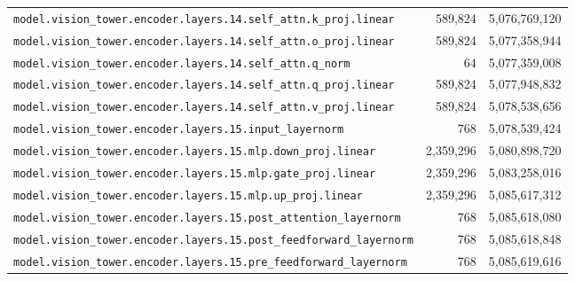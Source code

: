 \documentclass[10pt,a4paper]{article}
\theoremstyle{definition}
\begin{document}
\begin{appendices}
\begin{longtable}{p{9.5cm}rr}
\texttt{model.\allowbreak{}vision\_tower.\allowbreak{}encoder.\allowbreak{}layers.\allowbreak{}14.\allowbreak{}self\_attn.\allowbreak{}k\_proj.\allowbreak{}linear} & 589,824 & 5,076,769,120 \\
\texttt{model.\allowbreak{}vision\_tower.\allowbreak{}encoder.\allowbreak{}layers.\allowbreak{}14.\allowbreak{}self\_attn.\allowbreak{}o\_proj.\allowbreak{}linear} & 589,824 & 5,077,358,944 \\
\texttt{model.\allowbreak{}vision\_tower.\allowbreak{}encoder.\allowbreak{}layers.\allowbreak{}14.\allowbreak{}self\_attn.\allowbreak{}q\_norm} & 64 & 5,077,359,008 \\
\texttt{model.\allowbreak{}vision\_tower.\allowbreak{}encoder.\allowbreak{}layers.\allowbreak{}14.\allowbreak{}self\_attn.\allowbreak{}q\_proj.\allowbreak{}linear} & 589,824 & 5,077,948,832 \\
\texttt{model.\allowbreak{}vision\_tower.\allowbreak{}encoder.\allowbreak{}layers.\allowbreak{}14.\allowbreak{}self\_attn.\allowbreak{}v\_proj.\allowbreak{}linear} & 589,824 & 5,078,538,656 \\
\texttt{model.\allowbreak{}vision\_tower.\allowbreak{}encoder.\allowbreak{}layers.\allowbreak{}15.\allowbreak{}input\_layernorm} & 768 & 5,078,539,424 \\
\texttt{model.\allowbreak{}vision\_tower.\allowbreak{}encoder.\allowbreak{}layers.\allowbreak{}15.\allowbreak{}mlp.\allowbreak{}down\_proj.\allowbreak{}linear} & 2,359,296 & 5,080,898,720 \\
\texttt{model.\allowbreak{}vision\_tower.\allowbreak{}encoder.\allowbreak{}layers.\allowbreak{}15.\allowbreak{}mlp.\allowbreak{}gate\_proj.\allowbreak{}linear} & 2,359,296 & 5,083,258,016 \\
\texttt{model.\allowbreak{}vision\_tower.\allowbreak{}encoder.\allowbreak{}layers.\allowbreak{}15.\allowbreak{}mlp.\allowbreak{}up\_proj.\allowbreak{}linear} & 2,359,296 & 5,085,617,312 \\
\texttt{model.\allowbreak{}vision\_tower.\allowbreak{}encoder.\allowbreak{}layers.\allowbreak{}15.\allowbreak{}post\_attention\_layernorm} & 768 & 5,085,618,080 \\
\texttt{model.\allowbreak{}vision\_tower.\allowbreak{}encoder.\allowbreak{}layers.\allowbreak{}15.\allowbreak{}post\_feedforward\_layernorm} & 768 & 5,085,618,848 \\
\texttt{model.\allowbreak{}vision\_tower.\allowbreak{}encoder.\allowbreak{}layers.\allowbreak{}15.\allowbreak{}pre\_feedforward\_layernorm} & 768 & 5,085,619,616 \\

\end{longtable}
\end{appendices}
\end{document}
